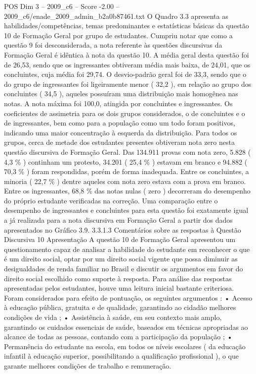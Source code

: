 \begin{textsample}{POS Dim 3 – 2009\_c6 – Score -2.00 – 2009\_c6/enade\_2009\_admin\_b2a0b87461.txt}
O Quadro 3.3 apresenta as habilidades/competências, temas predominantes e estatísticas básicas da questão 10 de Formação Geral por grupo de estudantes.
Cumpriu notar que como a questão 9 foi desconsiderada, a nota referente às questões discursivas da Formação Geral é idêntica à nota da questão 10.
A média geral desta questão foi de 26,53, sendo que os ingressantes obtiveram média mais baixa, de 24,01, que os concluintes, cuja média foi 29,74.
O desvio-padrão geral foi de 33,3, sendo que o do grupo de ingressantes foi ligeiramente menor ( 32,2 ), em relação ao grupo dos concluintes ( 34,5 ), aqueles possuíram uma distribuição mais homogênea nas notas.
A nota máxima foi 100,0, atingida por concluintes e ingressantes.
Os coeficientes de assimetria para os dois grupos considerados, o de concluintes e o de ingressantes, bem como para a população como um todo foram positivos, indicando uma maior concentração à esquerda da distribuição.
Para todos os grupos, cerca de metade dos estudantes presentes obtiveram nota zero nesta questão discursiva de Formação Geral.
Das 134.911 provas com nota zero, 5.828 ( 4,3 \% ) continham um protesto, 34.201 ( 25,4 \% ) estavam em branco e 94.882 ( 70,3 \% ) foram respondidas, porém de forma inadequada.
Entre os concluintes, a minoria ( 22,7 \% ) dentre aqueles com nota zero estava com a prova em branco.
Entre os ingressantes, 68,8 \% das notas nulas ( zero ) decorreram do desempenho do próprio estudante verificadas na correção.
Uma comparação entre o desempenho de ingressantes e concluintes para esta questão foi exatamente igual a já realizada para a nota discursiva em Formação Geral a partir dos dados apresentados no Gráfico 3.9. 3.3.1.3 Comentários sobre as respostas à Questão Discursiva 10 Apresentação A questão 10 de Formação Geral apresentou um questionamento capaz de analisar a habilidade do estudante em reconhecer o que é um direito social, optar por um direito social vigente que possa diminuir as desigualdades de renda familiar no Brasil e discutir os argumentos em favor do direito social escolhido como suporte à resposta.
Para análise das respostas apresentadas pelos estudantes, houve uma leitura inicial bastante criteriosa.
Foram considerados para efeito de pontuação, os seguintes argumentos : • Acesso à educação pública, gratuita e de qualidade, garantindo ao cidadão melhores condições de vida ; • Assistência à saúde, em seu contexto mais amplo, garantindo os cuidados essenciais de saúde, baseados em técnicas apropriadas ao alcance de todas as pessoas, contando com a participação da população ; • Permanência do estudante na escola, em todos os níveis escolares ( da educação infantil à educação superior, possibilitando a qualificação profissional ), o que garante melhores condições de trabalho e remuneração.

\end{textsample}
